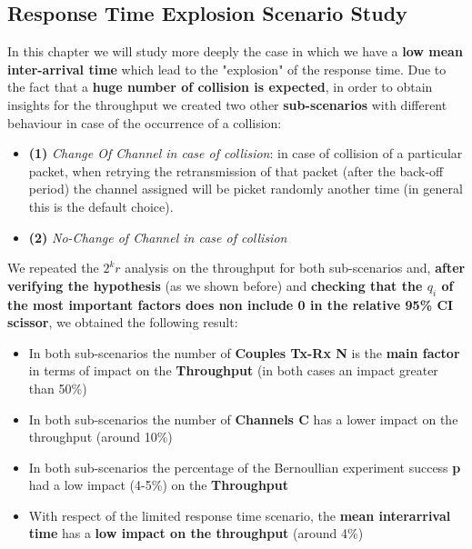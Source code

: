 
\subsection{Response Time Explosion Scenario Study}
In this chapter we will study more deeply the case in which we have a \textbf{low mean inter-arrival time} which lead to the "explosion" of the response time. Due to the fact that a \textbf{huge number of collision is expected}, in order to obtain insights for the throughput we created two other \textbf{sub-scenarios} with different behaviour in case of the occurrence of a collision: 
\begin{itemize}
	\item \textbf{(1)} \textit{Change Of Channel in case of collision}: in case of collision of a particular packet, when retrying the retransmission of that packet (after the back-off period) the channel assigned will be picket randomly another time (in general this is the default choice).
	\item \textbf{(2)} \textit{No-Change of Channel in case of collision}
\end{itemize}

We repeated the $2^{k}r$ analysis on the throughput for both sub-scenarios and, \textbf{after verifying the hypothesis} (as we shown before) and \textbf{checking that the $q_{i}$ of the most important factors does non include 0 in the relative 95\% CI scissor}, we obtained the following result:
\begin{itemize}
	\item In both sub-scenarios the number of \textbf{Couples Tx-Rx N} is the \textbf{main factor} in terms of impact on the \textbf{Throughput} (in both cases an impact greater than 50\%)
	\item In both sub-scenarios the number of \textbf{Channels C} has a lower impact on the throughput (around 10\%)
	\item In both sub-scenarios the percentage of the Bernoullian experiment success \textbf{p} had a low impact (4-5\%) on the \textbf{Throughput}
	\item With respect of the limited response time scenario, the \textbf{mean interarrival time} has a \textbf{low impact on the throughput} (around 4\%) 
\end{itemize}
